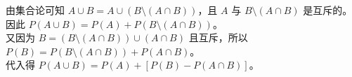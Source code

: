\begin{questions}
\begin{solution}
    由集合论可知 $A \cup B = A \cup (B \setminus (A \cap B))$，且 $A$ 与 $B \setminus (A \cap B)$ 是互斥的。\\
    因此 $P(A \cup B) = P(A) + P(B \setminus (A \cap B))$。\\
    又因为 $B = (B \setminus (A \cap B)) \cup (A \cap B)$ 且互斥，所以 $P(B) = P(B \setminus (A \cap B)) + P(A \cap B)$。\\
    代入得 $P(A \cup B) = P(A) + [P(B) - P(A \cap B)]$。
\end{solution}
\end{questions}


